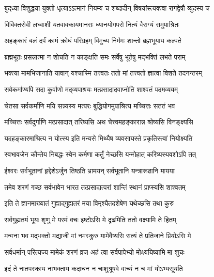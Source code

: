 \twolineshloka
{बुद्‌ध्या विशुद्धया युक्तो धृत्याऽऽत्मानं नियम्य च}
{शब्दादीन् विषयांस्त्यक्त्वा रागद्वेषौ व्युदस्य च}%

\twolineshloka
{विविक्तसेवी लघ्वाशी यतवाक्कायमानसः}
{ध्यानयोगपरो नित्यं वैराग्यं समुपाश्रितः}%

\twolineshloka
{अहङ्कारं बलं दर्पं कामं क्रोधं परिग्रहम्}
{विमुच्य निर्ममः शान्तो ब्रह्मभूयाय कल्पते}%

\twolineshloka
{ब्रह्मभूतः प्रसन्नात्मा न शोचति न काङ्क्षति}
{समः सर्वेषु भूतेषु मद्भक्तिं लभते पराम्}%

\twolineshloka
{भक्त्या मामभिजानाति यावान् यश्चास्मि तत्त्वतः}
{ततो मां तत्त्वतो ज्ञात्वा विशते तदनन्तरम्}%

\twolineshloka
{सर्वकर्माण्यपि सदा कुर्वाणो मद्‌व्यपाश्रयः}
{मत्प्रसादादवाप्नोति शाश्वतं पदमव्ययम्}%

\twolineshloka
{चेतसा सर्वकर्माणि मयि सन्न्यस्य मत्परः}
{बुद्धियोगमुपाश्रित्य मच्चित्तः सततं भव}%

\twolineshloka
{मच्चित्तः सर्वदुर्गाणि मत्प्रसादात् तरिष्यसि}
{अथ चेत्त्वमहङ्कारान्न श्रोष्यसि विनङ्क्ष्यसि}%

\twolineshloka
{यदहङ्कारमाश्रित्य न योत्स्य इति मन्यसे}
{मिथ्यैष व्यवसायस्ते प्रकृतिस्त्वां नियोक्ष्यति}%

\twolineshloka
{स्वभावजेन कौन्तेय निबद्धः स्वेन कर्मणा}
{कर्तुं नेच्छसि यन्मोहात् करिष्यस्यवशोऽपि तत्}%

\twolineshloka
{ईश्वरः सर्वभूतानां हृद्देशेऽर्जुन तिष्ठति}
{भ्रामयन् सर्वभूतानि यन्त्रारूढानि मायया}%

\twolineshloka
{तमेव शरणं गच्छ सर्वभावेन भारत}
{तत्प्रसादात्परां शान्तिं स्थानं प्राप्स्यसि शाश्वतम्}
{}%

\twolineshloka
{इति ते ज्ञानमाख्यातं गुह्याद्गुह्यतरं मया}
{विमृश्यैतदशेषेण यथेच्छसि तथा कुरु}%

\twolineshloka
{सर्वगुह्यतमं भूयः शृणु मे परमं वचः}
{इष्टोऽसि मे दृढमिति ततो वक्ष्यामि ते हितम्}%

\twolineshloka
{मन्मना भव मद्भक्तो मद्याजी मां नमस्कुरु}
{मामेवैष्यसि सत्यं ते प्रतिजाने प्रियोऽसि मे}%

\twolineshloka
{सर्वधर्मान् परित्यज्य मामेकं शरणं व्रज}
{अहं त्वा सर्वपापेभ्यो मोक्ष्ययिष्यामि मा शुचः}%

\twolineshloka
{इदं ते नातपस्काय नाभक्ताय कदाचन}
{न चाशुश्रूषवे वाच्यं न च मां योऽभ्यसूयति}%

